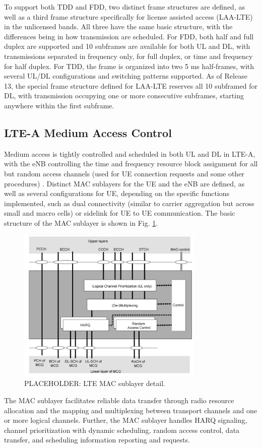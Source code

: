 To support both TDD and FDD, two distinct frame structures are defined, as well as a third frame structure specifically for license assisted access (LAA-LTE) in the unlicensed bands.  All three have the same basic structure, with the differences being in how transmission are scheduled.  For FDD, both half and full duplex are supported and 10 subframes are available for both UL and DL, with transmissions separated in frequency only, for full duplex, or time and frequency for half duplex.  For TDD, the frame is organized into two 5 ms half-frames, with several UL/DL configurations and switching patterns supported.  As of Release 13, the special frame structure defined for LAA-LTE reserves all 10 subframed for DL, with transmission occupying one or more consecutive subframes, starting anywhere within the first subframe.


\subsection{LTE-A Medium Access Control}
\label{lte-mac}
Medium access is tightly controlled and scheduled in both UL and DL in LTE-A, with the eNB controlling the time and frequency resource block assignment for all but random access channels (used for UE connection requests and some other procedures) \cite{tr36321}.  Distinct MAC sublayers for the UE and the eNB are defined, as well as several configurations for UE, depending on the specific functions implemented, such as dual connectivity (similar to carrier aggregation but across small and macro cells) or sidelink for UE to UE communication. The basic structure of the MAC sublayer is shown in Fig. \ref{figs:lte-mac}.
\begin{figure}[!ht]
	\centering
	\includegraphics[width=3.5in]{figures3/lteAmac}	\caption{PLACEHOLDER: LTE MAC sublayer detail.}
	\label{figs:lte-mac}
\end{figure}
The MAC sublayer facilitates reliable data transfer through radio resource allocation and the mapping and multiplexing between transport channels and one or more logical channels.  Further, the MAC sublayer handles HARQ signaling, channel prioritization with dynamic scheduling, random access control, data transfer, and scheduling information reporting and requests.  

